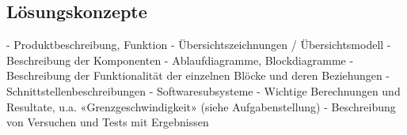 \documentclass[../../main.tex]{subfiles}
\begin{document}
\subsection{Lösungskonzepte}

- Produktbeschreibung, Funktion
- Übersichtszeichnungen / Übersichtsmodell
- Beschreibung der Komponenten
- Ablaufdiagramme, Blockdiagramme
- Beschreibung der Funktionalität der einzelnen Blöcke und deren Beziehungen
- Schnittstellenbeschreibungen
- Softwaresubsysteme
- Wichtige Berechnungen und Resultate, u.a. «Grenzgeschwindigkeit» (siehe Aufgabenstellung)
- Beschreibung von Versuchen und Tests mit Ergebnissen
\end{document}

